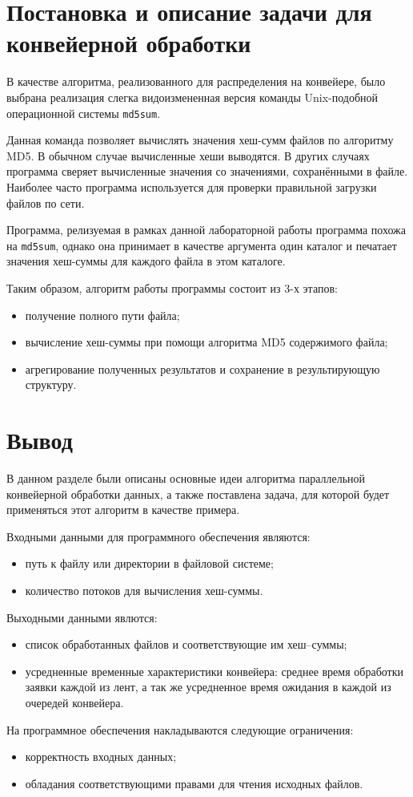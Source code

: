 \section{Постановка и описание задачи для конвейерной об­работки}

В качестве алгоритма, реализованного для распределения на конвейере, было выбрана
реализация слегка видоизмененная версия команды Unix-подобной операционной системы \texttt{md5sum}. 

Данная команда позволяет вычислять значения хеш-сумм файлов по алгоритму MD5. В
обычном случае вычисленные хеши выводятся. В других случаях программа сверяет 
вычисленные значения со значениями, сохранёнными в файле. Наиболее часто программа 
используется для проверки правильной загрузки файлов по сети. 

Программа, релизуемая в рамках данной лабораторной работы программа похожа на 
\texttt{md5sum}, однако она принимает в качестве 
аргумента один каталог и печатает значения хеш-суммы для каждого файла в этом каталоге.

Таким образом, алгоритм работы программы состоит из 3-х этапов:

\begin{itemize}
	\item получение полного пути файла;
	\item вычисление хеш-суммы при помощи алгоритма MD5 содержимого файла;
	\item агрегирование полученных результатов и сохранение в результирующую структуру.
\end{itemize}


\section{Вывод}

В данном разделе были описаны основные идеи алгоритма парал­лельной 
конвейерной обработки данных, а также поставлена задача, для которой 
будет применяться этот алгоритм в качестве примера.

Входными данными для программного обеспечения являются:
\begin{itemize}
	\item путь к файлу или директории в файловой системе;
	\item количество потоков для вычисления хеш-суммы.
\end{itemize}

Выходными данными явлются:
\begin{itemize}
	\item список обработанных файлов и соответствующие им хеш–суммы;
	\item усредненные временные характеристики конвейера: среднее время обработки заявки 
	каждой из лент, а так же усредненное время ожидания в каждой из очередей конвейера.
\end{itemize}

На программное обеспечения накладываются следующие ограничения:
\begin{itemize}
	\item корректность входных данных;
	\item обладания соответствующими правами для чтения исходных файлов.
\end{itemize}